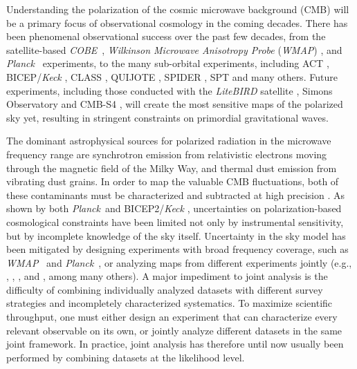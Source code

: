 \documentclass[twocolumn]{../../common/aa}
\def\WMAP{\emph{WMAP}}
\def\COBE{\emph{COBE}}
\def\Planck{\emph{Planck}}
\begin{document}
Understanding the polarization of the cosmic microwave background (CMB) will be a primary focus of observational cosmology in the coming decades. There has been phenomenal observational success over the past few decades, from the satellite-based \COBE\ \citep{smoot:1992,mather:1994,hauser:1998}, \textit{Wilkinson Microwave Anisotropy Probe} (\WMAP) \citep{bennett2012}, and \Planck\ \citep{planck2016-l01} experiments, to the many sub-orbital experiments, including ACT \citep{actDR6_lensing}, BICEP/\textit{Keck} \citep{bicep2021}, CLASS \citep{eimer2023}, QUIJOTE \citep{QUIJOTE_IV}, SPIDER \citep{spider21}, SPT \citep{carlstrom:2011} and many others. Future experiments, including those conducted with the \textit{LiteBIRD} satellite \citep{litebird2022},  Simons Observatory \citep{SO2019} and CMB-S4 \citep{cmbs4},  will create the most sensitive maps of the polarized sky yet, resulting in stringent constraints on primordial gravitational waves.

The dominant astrophysical sources for polarized radiation in the microwave frequency range are synchrotron emission from relativistic electrons moving through the magnetic field of the Milky Way, and thermal dust emission from vibrating dust grains. In order to map the valuable CMB fluctuations, both of these contaminants must be characterized and subtracted at high precision \citep{planck2014-a12}. As shown by both \Planck\ and BICEP2/\textit{Keck} \citep{planck2016-l02,pb2015}, uncertainties on polarization-based cosmological constraints have been limited not only by instrumental sensitivity, but by incomplete knowledge of the sky itself. Uncertainty in the sky model has been mitigated by designing experiments with broad frequency coverage, such as \WMAP\ \citep{bennett2012} and \Planck\ \citep{planck2016-l01}, or analyzing maps from different experiments jointly (e.g., \citealp{dmr}, \citealp{bennett2012}, \citealp{planck2014-a12}, and \citealp{pb2015}, among many others).
A major impediment to joint analysis is the difficulty of combining individually analyzed datasets with different survey strategies and incompletely characterized systematics. To maximize scientific throughput, one must either design an experiment that can characterize every relevant observable on its own, or jointly analyze different datasets in the same joint framework. In practice, joint analysis has therefore  until now usually been performed by combining datasets at the likelihood level.
\end{document}
